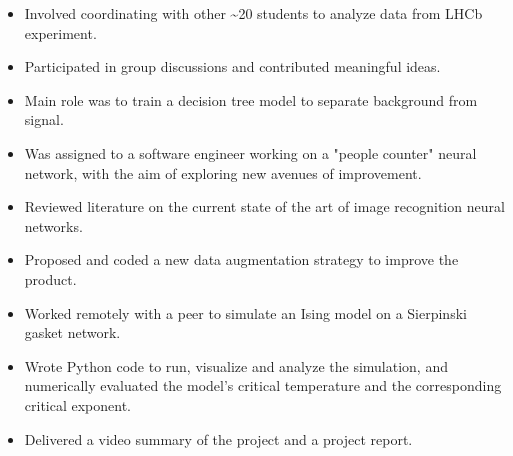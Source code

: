 \documentclass{res}[12pt] %
\begin{document}
\begin{resume}
\begin{itemize}
\item Involved coordinating with other \textasciitilde 20 students to analyze data from LHCb experiment.
\item Participated in group discussions and contributed meaningful ideas.
\item Main role was to train a decision tree model to separate background from signal.
\end{itemize}


\begin{itemize}
\item Was assigned to a software engineer working on a "people counter" neural network, with the aim of exploring new avenues of improvement.
\item Reviewed literature on the current state of the art of image recognition neural networks.
\item Proposed and coded a new data augmentation strategy to improve the product.
\end{itemize}

\begin{itemize}
\item Worked remotely with a peer to simulate an Ising model on a Sierpinski gasket network.
\item Wrote Python code to run, visualize and analyze the simulation, and numerically evaluated the model's critical temperature and the corresponding critical exponent.
\item Delivered a video summary of the project and a project report.
\end{itemize}


 

\newpage
{}
\sectionRule
\vspace{6pt} %


\end{resume}
\end{document}
